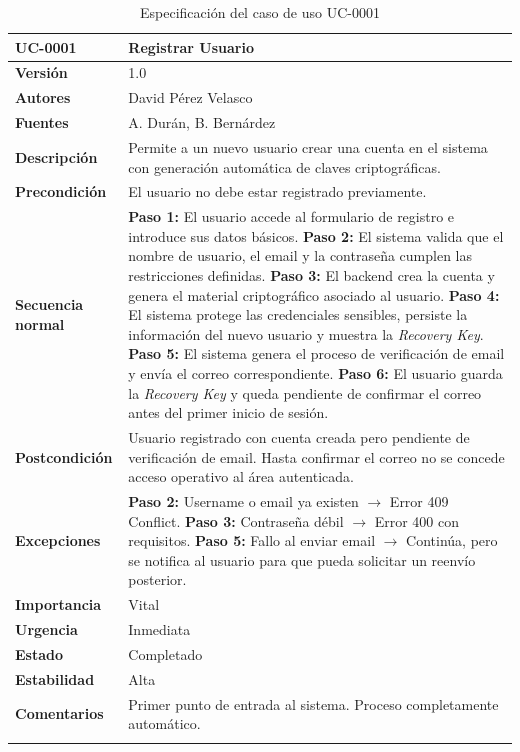 \documentclass[11pt, a4paper]{article}
\begin{document}
\begin{longtable}{|p{4cm}|p{10cm}|}
\hline
\textbf{UC-0001} & Registrar Usuario \\
\hline
\textbf{Versión} & 1.0 \\
\hline
\textbf{Autores} & David Pérez Velasco \\
\hline
\textbf{Fuentes} & A. Durán, B. Bernárdez \\
\hline
\textbf{Descripción} & Permite a un nuevo usuario crear una cuenta en el sistema con generación automática de claves criptográficas. \\
\hline
\textbf{Precondición} & El usuario no debe estar registrado previamente. \\
\hline
\textbf{Secuencia normal} & 
\textbf{Paso 1:} El usuario accede al formulario de registro e introduce sus datos básicos.\newline
\textbf{Paso 2:} El sistema valida que el nombre de usuario, el email y la contraseña cumplen las restricciones definidas.\newline
\textbf{Paso 3:} El backend crea la cuenta y genera el material criptográfico asociado al usuario.\newline
\textbf{Paso 4:} El sistema protege las credenciales sensibles, persiste la información del nuevo usuario y muestra la \textit{Recovery Key}.\newline
\textbf{Paso 5:} El sistema genera el proceso de verificación de email y envía el correo correspondiente.\newline
\textbf{Paso 6:} El usuario guarda la \textit{Recovery Key} y queda pendiente de confirmar el correo antes del primer inicio de sesión.\\
\hline
\textbf{Postcondición} & Usuario registrado con cuenta creada pero pendiente de verificación de email. Hasta confirmar el correo no se concede acceso operativo al área autenticada. \\
\hline
\textbf{Excepciones} & 
\textbf{Paso 2:} Username o email ya existen $\rightarrow$ Error 409 Conflict.\newline
\textbf{Paso 3:} Contraseña débil $\rightarrow$ Error 400 con requisitos.\newline
\textbf{Paso 5:} Fallo al enviar email $\rightarrow$ Continúa, pero se notifica al usuario para que pueda solicitar un reenvío posterior.\\
\hline
\textbf{Importancia} & Vital \\
\hline
\textbf{Urgencia} & Inmediata \\
\hline
\textbf{Estado} & Completado \\
\hline
\textbf{Estabilidad} & Alta \\
\hline
\textbf{Comentarios} & Primer punto de entrada al sistema. Proceso completamente automático. \\
\hline
\caption{Especificación del caso de uso UC-0001}
\end{longtable}
\end{document}
